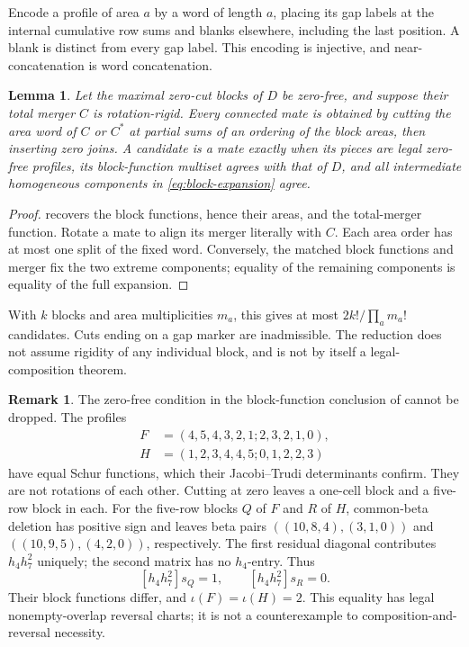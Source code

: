 \documentclass[11pt,a4paper]{amsart}
\numberwithin{equation}{section}
\theoremstyle{plain}
\newtheorem{lemma}[theorem]{Lemma}
\theoremstyle{definition}
\newtheorem{remark}[theorem]{Remark}
\begin{document}
Encode a profile of area \(a\) by a word of length \(a\), placing its gap labels at the internal cumulative row sums and blanks elsewhere, including the last position.  A blank is distinct from every gap label.  This encoding is injective, and near-concatenation is word concatenation.

\begin{lemma}\label{lem:area-cuts}
Let the maximal zero-cut blocks of \(D\) be zero-free, and suppose their total merger \(C\) is rotation-rigid.  Every connected mate is obtained by cutting the area word of \(C\) or \(C^*\) at partial sums of an ordering of the block areas, then inserting zero joins.  A candidate is a mate exactly when its pieces are legal zero-free profiles, its block-function multiset agrees with that of \(D\), and all intermediate homogeneous components in \eqref{eq:block-expansion} agree.
\end{lemma}
\begin{proof}
 recovers the block functions, hence their areas, and the total-merger function.  Rotate a mate to align its merger literally with \(C\).  Each area order has at most one split of the fixed word.  Conversely, the matched block functions and merger fix the two extreme components; equality of the remaining components is equality of the full expansion.
\end{proof}

With \(k\) blocks and area multiplicities \(m_a\), this gives at most \(2k!/\prod_a m_a!\) candidates.  Cuts ending on a gap marker are inadmissible.  The reduction does not assume rigidity of any individual block, and is not by itself a legal-composition theorem.

\begin{remark}\label{rem:internal-unit-obstruction}
The zero-free condition in the block-function conclusion of  cannot be dropped.  The profiles
\[
 \begin{aligned}
 F&=(4,5,4,3,2,1;2,3,2,1,0),\\
 H&=(1,2,3,4,4,5;0,1,2,2,3)
 \end{aligned}
\]
have equal Schur functions, which their Jacobi--Trudi determinants confirm.  They are not rotations of each other.  Cutting at zero leaves a one-cell block and a five-row block in each.  For the five-row blocks \(Q\) of \(F\) and \(R\) of \(H\), common-beta deletion has positive sign and leaves beta pairs \(((10,8,4),(3,1,0))\) and \(((10,9,5),(4,2,0))\), respectively.  The first residual diagonal contributes \(h_4h_7^2\) uniquely; the second matrix has no \(h_4\)-entry.  Thus
\[
 [h_4h_7^2]s_Q=1,\qquad [h_4h_7^2]s_R=0.
\]
Their block functions differ, and \(\iota(F)=\iota(H)=2\).  This equality has legal nonempty-overlap reversal charts; it is not a counterexample to composition-and-reversal necessity.
\end{remark}
\end{document}
